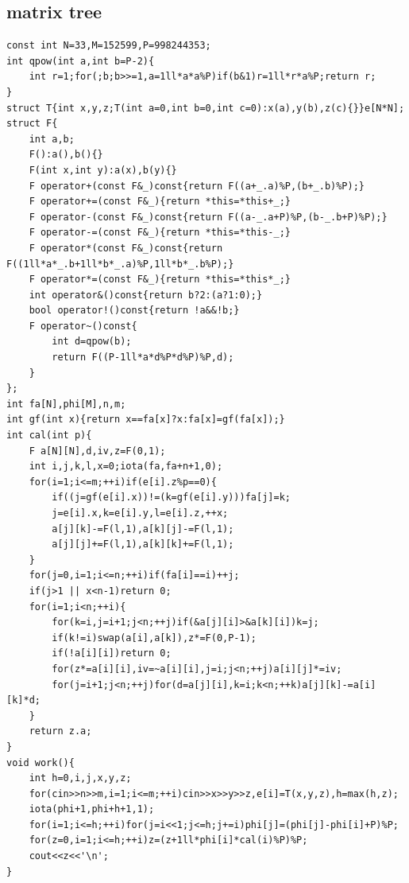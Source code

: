 \documentclass[UTF8, a4paper, titlepage, twoside]{ctexart}
\begin{document}
\subsection{ matrix tree }
\begin{lstlisting}[style=cpp]
const int N=33,M=152599,P=998244353;
int qpow(int a,int b=P-2){
    int r=1;for(;b;b>>=1,a=1ll*a*a%P)if(b&1)r=1ll*r*a%P;return r;
}
struct T{int x,y,z;T(int a=0,int b=0,int c=0):x(a),y(b),z(c){}}e[N*N];
struct F{
    int a,b;
    F():a(),b(){}
    F(int x,int y):a(x),b(y){}
    F operator+(const F&_)const{return F((a+_.a)%P,(b+_.b)%P);}
    F operator+=(const F&_){return *this=*this+_;}
    F operator-(const F&_)const{return F((a-_.a+P)%P,(b-_.b+P)%P);}
    F operator-=(const F&_){return *this=*this-_;}
    F operator*(const F&_)const{return F((1ll*a*_.b+1ll*b*_.a)%P,1ll*b*_.b%P);}
    F operator*=(const F&_){return *this=*this*_;}
    int operator&()const{return b?2:(a?1:0);}
    bool operator!()const{return !a&&!b;}
    F operator~()const{
        int d=qpow(b);
        return F((P-1ll*a*d%P*d%P)%P,d);
    }
};
int fa[N],phi[M],n,m;
int gf(int x){return x==fa[x]?x:fa[x]=gf(fa[x]);}
int cal(int p){
    F a[N][N],d,iv,z=F(0,1);
    int i,j,k,l,x=0;iota(fa,fa+n+1,0);
    for(i=1;i<=m;++i)if(e[i].z%p==0){
        if((j=gf(e[i].x))!=(k=gf(e[i].y)))fa[j]=k;
        j=e[i].x,k=e[i].y,l=e[i].z,++x;
        a[j][k]-=F(l,1),a[k][j]-=F(l,1);
        a[j][j]+=F(l,1),a[k][k]+=F(l,1);
    }
    for(j=0,i=1;i<=n;++i)if(fa[i]==i)++j;
    if(j>1 || x<n-1)return 0;
    for(i=1;i<n;++i){
        for(k=i,j=i+1;j<n;++j)if(&a[j][i]>&a[k][i])k=j;
        if(k!=i)swap(a[i],a[k]),z*=F(0,P-1);
        if(!a[i][i])return 0;
        for(z*=a[i][i],iv=~a[i][i],j=i;j<n;++j)a[i][j]*=iv;
        for(j=i+1;j<n;++j)for(d=a[j][i],k=i;k<n;++k)a[j][k]-=a[i][k]*d;
    }
    return z.a;
}
void work(){
    int h=0,i,j,x,y,z;
    for(cin>>n>>m,i=1;i<=m;++i)cin>>x>>y>>z,e[i]=T(x,y,z),h=max(h,z);
    iota(phi+1,phi+h+1,1);
    for(i=1;i<=h;++i)for(j=i<<1;j<=h;j+=i)phi[j]=(phi[j]-phi[i]+P)%P;
    for(z=0,i=1;i<=h;++i)z=(z+1ll*phi[i]*cal(i)%P)%P;
    cout<<z<<'\n';
}
\end{lstlisting}
\end{document}
